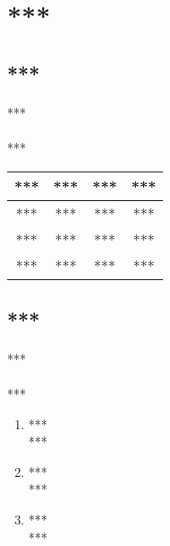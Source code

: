 \documentclass{ctexart}
\begin{document}
    \section{***}
    \subsection{***}
    \paragraph{}***
    \paragraph{}*** 
    \begin{tabular}{|c|c|c|c|}
    \hline
    *** & *** & *** & *** \\ 
    \hline
    *** & *** & *** & *** \\
    \hline
    *** & *** & *** & *** \\
    \hline
    *** & *** & *** & *** \\
    \hline
    \end{tabular}

    \subsection{***}
    \paragraph{}***
    \paragraph{}***
    \begin{enumerate}
        \item *** \\
        ***
        \item *** \\
        ***
        \item *** \\
        ***
    \end{enumerate}
\end{document}
